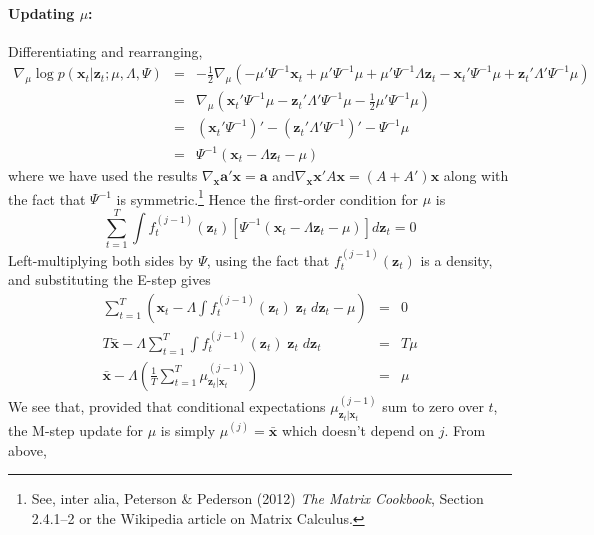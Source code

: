 \documentclass[12pt]{article}
\theoremstyle{definition}
\begin{document}

\paragraph{Updating $\mu$:} Differentiating and rearranging, 
 \begin{eqnarray*}
 	\nabla_\mu \log p(\mathbf{x}_t|\mathbf{z}_t;\mu, \Lambda, \Psi) &=& -\frac{1}{2} \nabla_\mu \left( -\mu' \Psi^{-1} \mathbf{x}_t + \mu' \Psi^{-1}\mu + \mu' \Psi^{-1} \Lambda \mathbf{z}_t - \mathbf{x}_t' \Psi^{-1} \mu +  \mathbf{z}_t'\Lambda' \Psi^{-1} \mu  \right)\\
 		&=& \nabla_\mu \left(\mathbf{x}_t' \Psi^{-1} \mu - \mathbf{z}_t' \Lambda' \Psi^{-1}\mu - \frac{1}{2} \mu' \Psi^{-1} \mu \right)\\
 		&=& \left(\mathbf{x}_t' \Psi^{-1}\right)' - \left(\mathbf{z}_t'\Lambda'\Psi^{-1}\right)' - \Psi^{-1}\mu\\
 		&=& \Psi^{-1}\left(\mathbf{x}_t  - \Lambda\mathbf{z}_t - \mu\right)
 \end{eqnarray*}
where we have used the results $\nabla_{\mathbf{x}}\mathbf{a}' \mathbf{x} = \mathbf{a}$ and$\nabla_{\mathbf{x}}\mathbf{x}'A \mathbf{x} = (A + A')\mathbf{x}$ along with the fact that $\Psi^{-1}$ is symmetric.\footnote{See, inter alia, Peterson \& Pederson (2012) \emph{The Matrix Cookbook}, Section 2.4.1--2 or the Wikipedia article on Matrix Calculus.} Hence the first-order condition for $\mu$ is
$$\sum_{t = 1}^T \int f_t^{(j-1)}(\mathbf{z}_t) \left[\Psi^{-1}\left(\mathbf{x}_t  - \Lambda\mathbf{z}_t - \mu\right) \right] d \mathbf{z}_t = 0$$
Left-multiplying both sides by $\Psi$, using the fact that $f_t^{(j-1)}(\mathbf{z}_t)$ is a density, and substituting the E-step gives
	\begin{eqnarray*}
		\sum_{t = 1}^T \left( \mathbf{x}_t - \Lambda \int f_t^{(j-1)}(\mathbf{z}_t) \; \mathbf{z}_t \; d \mathbf{z}_t - \mu\right)   &=& 0\\
 T\bar{\mathbf{x}} - \Lambda \sum_{t = 1}^T \int f_t^{(j-1)}(\mathbf{z}_t) \; \mathbf{z}_t \; d\mathbf{z}_t &=& T \mu \\
 	\bar{\mathbf{x}}  - \Lambda \left( \frac{1}{T} \sum_{t=1}^T \mu^{(j-1)}_{\mathbf{z}_t|\mathbf{x}_t} \right) &=& \mu
	\end{eqnarray*}
We see that, provided that conditional expectations $\mu^{(j-1)}_{\mathbf{z}_t|\mathbf{x}_t}$ sum to zero over $t$, the M-step update for $\mu$ is simply $\mu^{(j)} = \bar{\mathbf{x}}$ which doesn't depend on $j$. From above, 
\end{document}
